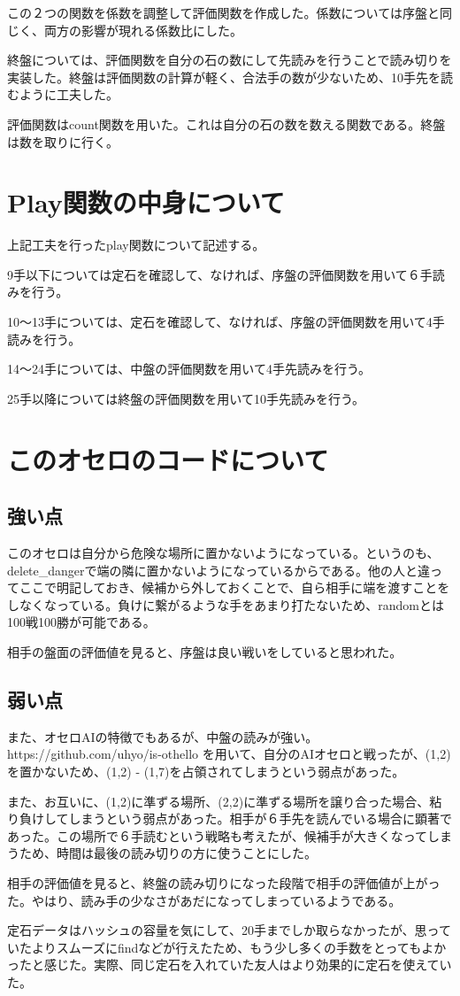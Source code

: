 \documentclass[uplatex,12pt]{jsarticle}
\begin{document}
この２つの関数を係数を調整して評価関数を作成した。係数については序盤と同じく、両方の影響が現れる係数比にした。

\vspace{12pt}

終盤については、評価関数を自分の石の数にして先読みを行うことで読み切りを実装した。終盤は評価関数の計算が軽く、合法手の数が少ないため、10手先を読むように工夫した。

評価関数はcount関数を用いた。これは自分の石の数を数える関数である。終盤は数を取りに行く。


\section{Play関数の中身について}
上記工夫を行ったplay関数について記述する。

9手以下については定石を確認して、なければ、序盤の評価関数を用いて６手読みを行う。

10〜13手については、定石を確認して、なければ、序盤の評価関数を用いて4手読みを行う。

14〜24手については、中盤の評価関数を用いて4手先読みを行う。

25手以降については終盤の評価関数を用いて10手先読みを行う。

\section{このオセロのコードについて}
\subsection{強い点}
このオセロは自分から危険な場所に置かないようになっている。というのも、delete\_dangerで端の隣に置かないようになっているからである。他の人と違ってここで明記しておき、候補から外しておくことで、自ら相手に端を渡すことをしなくなっている。負けに繋がるような手をあまり打たないため、randomとは100戦100勝が可能である。

相手の盤面の評価値を見ると、序盤は良い戦いをしていると思われた。

\subsection{弱い点}
また、オセロAIの特徴でもあるが、中盤の読みが強い。https://github.com/uhyo/is-othello を用いて、自分のAIオセロと戦ったが、(1,2)を置かないため、(1,2) - (1,7)を占領されてしまうという弱点があった。

また、お互いに、(1,2)に準ずる場所、(2,2)に準ずる場所を譲り合った場合、粘り負けしてしまうという弱点があった。相手が６手先を読んでいる場合に顕著であった。この場所で６手読むという戦略も考えたが、候補手が大きくなってしまうため、時間は最後の読み切りの方に使うことにした。

相手の評価値を見ると、終盤の読み切りになった段階で相手の評価値が上がった。やはり、読み手の少なさがあだになってしまっているようである。

定石データはハッシュの容量を気にして、20手までしか取らなかったが、思っていたよりスムーズにfindなどが行えたため、もう少し多くの手数をとってもよかったと感じた。実際、同じ定石を入れていた友人はより効果的に定石を使えていた。
\end{document}
